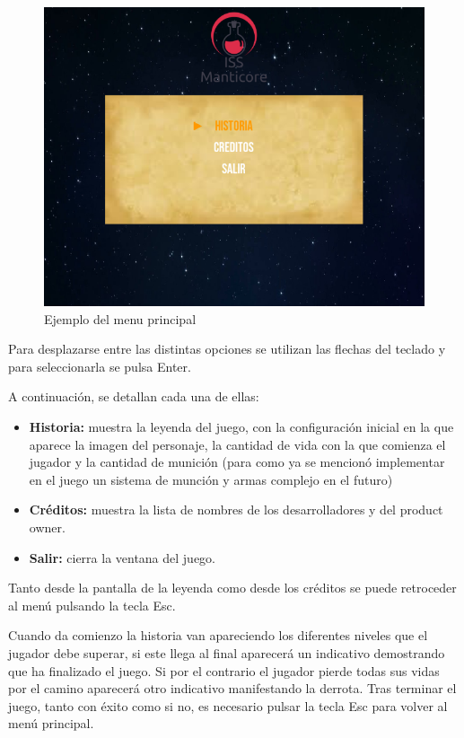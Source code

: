 \begin{figure}[H]
	\centering
	\includegraphics[scale=0.50]{imagenes/EjemploMenuPrincipal.png}
	\caption{\label{fig:EjemploMenuPrincipal}Ejemplo del menu principal}
\end{figure}

Para desplazarse entre las distintas opciones se utilizan las flechas del teclado y para seleccionarla se pulsa Enter.  

A continuación, se detallan cada una de ellas: 
\begin{itemize}
	\item \textbf{Historia:} muestra la leyenda del juego, con la configuración inicial en la que aparece la imagen del personaje, la cantidad de vida con la que comienza el jugador y la cantidad de munición (para como ya se mencionó implementar en el juego un sistema de munción y armas complejo en el futuro) 
	\item \textbf{Créditos:} muestra la lista de nombres de los desarrolladores y del product owner.  
	\item \textbf{Salir:} cierra la ventana del juego. 
\end{itemize}



Tanto desde la pantalla de la leyenda como desde los créditos se puede retroceder al menú pulsando la tecla Esc. 


Cuando da comienzo la historia van apareciendo los diferentes niveles que el jugador debe superar, si este llega al final aparecerá un indicativo demostrando que ha finalizado el juego. Si por el contrario el jugador pierde todas sus vidas por el camino aparecerá otro indicativo manifestando la derrota. Tras terminar el juego, tanto con éxito como si no, es necesario pulsar la tecla Esc para volver al menú principal.   
